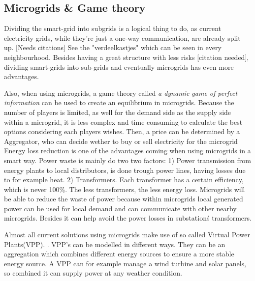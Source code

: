 \subsection{Microgrids \& Game theory}
Dividing the smart-grid into subgrids is a logical thing to do, as current electricity grids, while they're just a one-way communication, are already split up. [Needs citations] See the "verdeelkastjes" which can be seen in every neighbourhood. Besides having a great structure with less risks [citation needed], dividing smart-grids into sub-grids and eventually microgrids  has even more advantages. 

Also, when using microgrids, a game theory called \emph{a dynamic game of perfect information}  can be used to create an equilibrium in microgrids. Because the number of players is limited, as well for the demand side as the supply side within a microgrid, it is less complex and time consuming to calculate the best options considering each players wishes. Then, a price can be determined by a Aggregator, who can decide wether to buy or sell electricity for the microgrid \cite{MicrogridModellingPetrosAristidou}\linebreak \indent
Energy loss reduction is one of the advantages coming when using microgrids in a smart way. Power waste is mainly do two two factors\cite{EnergyLossURL}: 1) Power transmission from energy plants to local distributors, is done trough power lines, having losses due to for example heat. 2) Transformers. Each transformer has a certain efficiency, which is never 100\%. The less transformers, the less energy loss.\linebreak \indent
Microgrids will be able to reduce the waste of power because within microgrids local generated power can be used for local demand and can communicate with other nearby microgrids. Besides it can help avoid the power losses in substation\'s transformers\cite{keypaper}.



Almost all current solutions using microgrids make use of so called Virtual Power Plants(VPP).\cite{vpprealenergy} . VPP's can be modelled in different ways. They can be an aggregation which combines different energy sources to ensure a more stable energy source\cite{vpprealenergy}. A VPP can for example manage a wind turbine and solar panels, so combined it can supply power at any weather condition. 	

